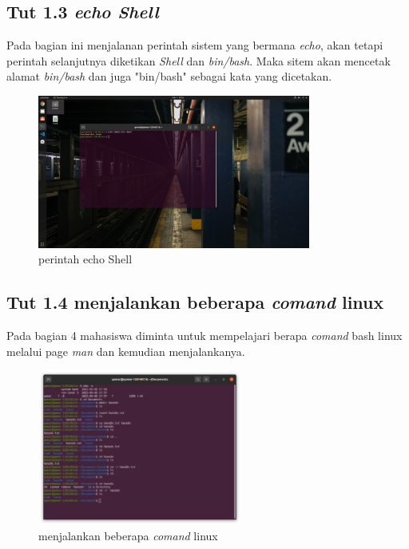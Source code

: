 \documentclass[11pt,a4paper]{article}
\begin{document}
\subsection{Tut 1.3 \textit{echo Shell}}
	Pada bagian ini menjalanan perintah sistem yang bermana \textit{echo}, akan tetapi perintah selanjutnya diketikan \textit{Shell} dan \textit{bin/bash}.
	Maka sitem akan mencetak alamat \textit{bin/bash} dan juga "bin/bash" sebagai kata yang dicetakan.
	\begin{figure}[h]
		\centering
		\includegraphics[width=0.8\textwidth]{figure/tut1_bagian3.png}
		\caption{perintah echo Shell}
	\end{figure}

\subsection{Tut 1.4 menjalankan beberapa \textit{comand} linux}
	Pada bagian 4 mahasiswa diminta untuk mempelajari berapa \textit{comand} bash linux melalui page \textit{man} dan kemudian menjalankanya.
	\begin{figure}[h]
		\centering
		\includegraphics[width=0.6\textwidth, ]{figure/tut1_bagian4.png}
		\caption{menjalankan beberapa \textit{comand} linux}
	\end{figure}
\end{document}
